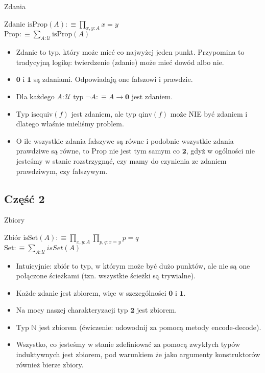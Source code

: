 \documentclass{beamer}
\newcommand{\defn}{:\equiv}
\newcommand{\U}{\mathcal{U}}
\newcommand{\qinv}{\text{qinv}}
\newcommand{\isequiv}{\text{isequiv}}
\newcommand{\isProp}{\text{isProp}}
\newcommand{\isSet}{\text{isSet}}
\newcommand{\Prop}{\text{Prop}}
\newcommand{\Set}{\text{Set}}
\begin{document}
\begin{frame}{Zdania}

\begin{block}{Zdanie}
$\isProp(A) \defn \prod_{x, y : A} x = y$ \\
$\Prop \defn \sum_{A : \U} \isProp(A)$
\end{block}

\begin{itemize}
	\item Zdanie to typ, który może mieć co najwyżej jeden punkt. Przypomina to tradycyjną logikę: twierdzenie (zdanie) może mieć dowód albo nie.
	\item $\textbf{0}$ i $\textbf{1}$ są zdaniami. Odpowiadają one fałszowi i prawdzie.
	\item Dla każdego $A : \U$ typ $\neg A \defn A \to \textbf{0}$ jest zdaniem.
	\item Typ $\isequiv(f)$ jest zdaniem, ale typ $\qinv(f)$ może NIE być zdaniem i dlatego właśnie mieliśmy problem.
	\item O ile wszystkie zdania fałszywe są równe i podobnie wszystkie zdania prawdziwe są równe, to $\Prop$ nie jest tym samym co $\textbf{2}$, gdyż w ogólności nie jesteśmy w stanie rozstrzygnąć, czy mamy do czynienia ze zdaniem prawdziwym, czy fałszywym.
\end{itemize}

\end{frame}

\subsection{Część 2}

\begin{frame}{Zbiory}

\begin{block}{Zbiór}
$\isSet(A) \defn \prod_{x, y : A} \prod_{p, q : x = y} p = q$ \\
$\Set \defn \sum_{A : \U} isSet(A)$
\end{block}

\begin{itemize}
	\item Intuicyjnie: zbiór to typ, w którym może być dużo punktów, ale nie są one połączone ścieżkami (tzn. wszystkie ścieżki są trywialne).
	\item Każde zdanie jest zbiorem, więc w szczególności $\textbf{0}$ i $\textbf{1}$.
	\item Na mocy naszej charakteryzacji typ $\textbf{2}$ jest zbiorem.
	\item Typ $\mathbb{N}$ jest zbiorem (ćwiczenie: udowodnij za pomocą metody encode-decode).
	\item Wszystko, co jesteśmy w stanie zdefiniować za pomocą zwykłych typów induktywnych jest zbiorem, pod warunkiem że jako argumenty konstruktorów również bierze zbiory.
\end{itemize}

\end{frame}
\end{document}
